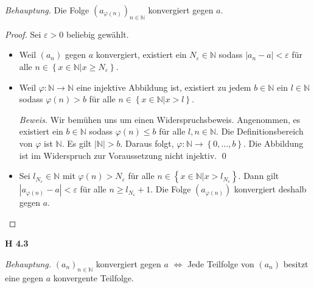 \documentclass[12pt]{extarticle}
\begin{document}
\textit{Behauptung.}  Die Folge \((a_{\varphi(n)})_{n \in \mathbb{N}}\)
konvergiert gegen \(a\).
\begin{proof}
  Sei \(\varepsilon > 0\) beliebig gewählt.

  \begin{itemize}
  \item   Weil \((a_n)\) gegen \(a\)
  konvergiert, existiert ein \(N_{\varepsilon} \in \mathbb{N}\) sodass
  \(|a_n - a| < \varepsilon\) für alle
  \(n \in \left\{ x \in \mathbb{N} | x \geq N_{\varepsilon} \right\}\).
\item   Weil \(\varphi: \mathbb{N} \rightarrow \mathbb{N}\) eine injektive
  Abbildung ist, existiert zu jedem \(b \in \mathbb{N}\) ein
  \(l \in \mathbb{N}\) sodass \(\varphi(n) > b\) für alle $n \in \left\{ x
    \in \mathbb{N} | x > l\right\}$.

  \textit{Beweis.}  Wir bemühen uns um einen Widerspruchsbeweis.
  Angenommen, es existiert ein \(b \in \mathbb{N}\) sodass
  \(\varphi(n) \leq b\) für alle \(l, n \in \mathbb{N}\).  Die
  Definitionsbereich von \(\varphi\) ist \(\mathbb{N}\).  Es gilt
  \(\left| \mathbb{N} \right| > b\).  Daraus folgt,
  \(\varphi: \mathbb{N} \rightarrow \left\{ 0, \ldots, b \right\}\).
  Die Abbildung ist im Widerspruch zur Voraussetzung nicht
  injektiv. \qed
\item Sei \(l_{N_{\varepsilon}} \in \mathbb{N}\) mit
  \(\varphi(n) > N_{\varepsilon}\) für alle
  \(n \in \left\{ x \in \mathbb{N} | x > l_{N_{\varepsilon}} \right\}\).
  Dann gilt \(|a_{\varphi(n)} - a| < \varepsilon\) für alle
  \(n \geq l_{N_{\varepsilon}} + 1\).  Die Folge \((a_{\varphi(n)})\)
  konvergiert deshalb gegen \(a\).
  \end{itemize}
\end{proof}

\textbf{H 4.3}

\textit{Behauptung.} \((a_n)_{n\in \mathbb{N}}\) konvergiert gegen \(a\)
\(\iff\) Jede Teilfolge von \((a_n)\) besitzt eine gegen \(a\) konvergente
Teilfolge.
\end{document}

